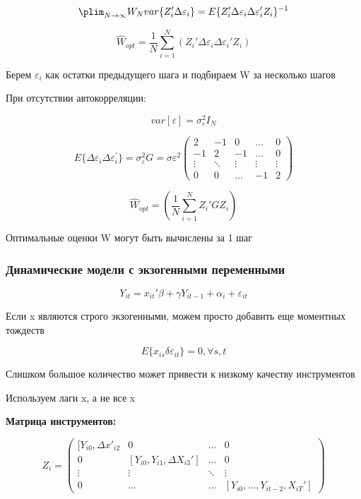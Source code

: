 \documentclass[a4paper, 12pt]{article}
\begin{document}
\[\plim_{N \to \infty} W_N var\{Z_i'\Delta \varepsilon_i\} 
= E\{Z_i'\Delta \varepsilon_i \Delta \varepsilon_i' Z_i\}^{-1}\]

\[\hat{W}_{opt} = \frac{1}{N} \sum_{i = 1}^N (Z_i'\Delta \varepsilon_i \Delta \varepsilon_i' Z_i)\]

Берем $\varepsilon_i$ как остатки предыдущего шага и подбираем W
за несколько шагов

При отсутствии автокорреляции:

\[var[\varepsilon] = \sigma_{\varepsilon}^2 I_N\]

\[E\{\Delta \varepsilon_{i} \Delta \varepsilon_i^{\prime}\} = 
\sigma_{\varepsilon}^2 G = \sigma{\varepsilon}^2
\begin{pmatrix}
    2 & -1 & 0 & \ldots & 0 \\
    -1 & 2 & -1 & \ldots & 0 \\
    \vdots & \ddots & \vdots & \vdots & \vdots \\
    0 & 0 & \ldots & - 1 & 2
\end{pmatrix}\]

\[\hat{W}_{opt} = \left(\frac{1}{N}\sum_{i = 1}^N Z_i'G Z_i \right)\]

Оптимальные оценки W могут быть вычислены за 1 шаг

\subsubsection{Динамические модели с экзогенными переменными}

\[Y_{it} = x_{it}'\beta + \gamma Y_{it - 1} + \alpha_i + \varepsilon_{it}\]

Если x являются строго экзогенными, можем просто добавить еще
моментных тождеств

\[E\{x_{is}\delta \varepsilon_{it}\} = 0, \forall s, t\]

Слишком большое количество может привести к низкому качеству инструментов

Используем лаги x, а не все x

\textbf{Матрица инструментов:}

\[Z_i = 
\begin{pmatrix}
    [Y_{i0}, \Delta x'_{i2} & 0 & \ldots & 0 \\
    0 & [Y_{i0}, Y_{i1}, \Delta X_{i3}'] & \ldots & 0 \\
    \vdots & \vdots & \ddots & \vdots \\
    0 & \ldots & \ldots & [Y_{i0}, \ldots, Y_{it - 2}, X_{iT}']
\end{pmatrix}\]
\end{document}
